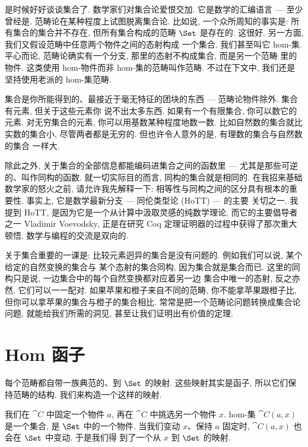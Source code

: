 
\lettrine[lhang=0.17]{是时候}{好好谈谈}集合了. 数学家们对集合论爱恨交加. 它是数学的汇编语言 ---
至少曾经是. 范畴论在某种程度上试图脱离集合论. 比如说, 一个众所周知的事实是: 所有集合的集合并不存在,
但所有集合构成的范畴 $\Set$ 是存在的. 这很好. 另一方面, 我们又假设范畴中任意两个物件之间的态射构成
一个集合. 我们甚至叫它 hom-集. 平心而论, 范畴论确实有一个分支, 那里的态射不构成集合, 而是另一个范畴
里的物件. 这类使用 hom-物件而非 hom-集的范畴叫作范畴. 不过在下文中, 我们还是
坚持使用老派的 hom-集范畴.

集合是你所能得到的、最接近于毫无特征的团块的东西 --- 范畴论物件除外. 集合有元素, 但关于这些元素你
说不出太多东西. 如果有一个有限集合, 你可以数它的元素. 对无穷集合的元素, 你可以用基数某种程度地数一数.
比如自然数的集合就比实数的集合小, 尽管两者都是无穷的. 但也许令人意外的是, 有理数的集合与自然数的集合
一样大.

除此之外, 关于集合的全部信息都能编码进集合之间的函数里 --- 尤其是那些可逆的、叫作同构的函数.
就一切实际目的而言, 同构的集合就是相同的. 在我招来基础数学家的怒火之前, 请允许我先解释一下:
相等性与同构之间的区分具有根本的重要性. 事实上, 它是数学最新分支 --- 同伦类型论 (HoTT) --- 的主要
关切之一. 我提到 HoTT, 是因为它是一个从计算中汲取灵感的纯数学理论, 而它的主要倡导者之一
Vladimir Voevodsky, 正是在研究 Coq 定理证明器的过程中获得了那次重大顿悟. 数学与编程的交流是双向的.

关于集合重要的一课是: 比较元素迥异的集合是没有问题的. 例如我们可以说, 某个给定的自然变换的集合与
某个态射的集合同构, 因为集合就是集合而已. 这里的同构只是说, 一边集合中的每个自然变换都对应着另一边
集合中唯一的态射, 反之亦然. 它们可以一一配对. 如果苹果和橙子来自不同的范畴, 你不能拿苹果跟橙子比,
但你可以拿苹果的集合与橙子的集合相比. 常常是把一个范畴论问题转换成集合论问题, 就能给我们所需的洞见,
甚至让我们证明出有价值的定理.

\section{Hom 函子}

每个范畴都自带一族典范的、到 $\Set$ 的映射. 这些映射其实是函子, 所以它们保持范畴的结构.
我们来构造一个这样的映射.

我们在 $\cat{C}$ 中固定一个物件 $a$, 再在 $\cat{C}$ 中挑选另一个物件 $x$.
hom-集 $\cat{C}(a, x)$ 是一个集合, 是 $\Set$ 中的一个物件. 当我们变动
$x$、保持 $a$ 固定时, $\cat{C}(a, x)$ 也会在 $\Set$ 中变动. 于是我们得
到了一个从 $x$ 到 $\Set$ 的映射.

